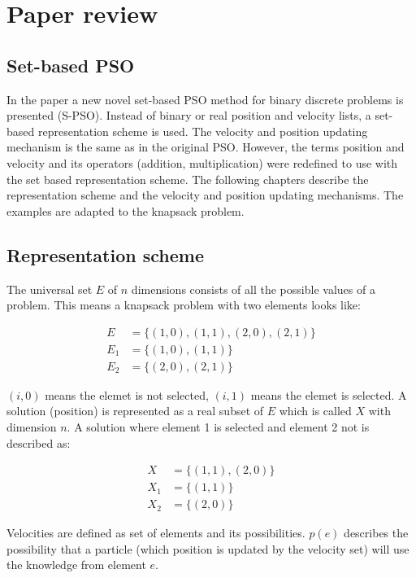 \documentclass{article}
\begin{document}
\section{Paper review}
\label{lbl-rev}
\subsection{Set-based PSO}
In the paper \cite{bib-sets} a new novel set-based PSO method for binary discrete problems is presented (S-PSO). Instead of binary or real position and velocity lists, a set-based representation scheme is used. The velocity and position updating mechanism is the same as in the original PSO. However, the terms position and velocity and its operators (addition, multiplication) were redefined to use with the set based representation scheme. The following chapters describe the representation scheme and the velocity and position updating mechanisms. The examples are adapted to the knapsack problem.

\subsection{Representation scheme}
The universal set $E$ of $n$ dimensions consists of all the possible values of a problem. This means a knapsack problem with two elements looks like:

\begin{equation}
\begin{aligned}
E &= \{(1,0),(1,1),(2,0),(2,1)\}\\
E_1 &= \{(1,0),(1,1)\}\\
E_2 &= \{(2,0),(2,1)\}
\end{aligned}
\end{equation}

$(i,0)$ means the elemet is not selected, $(i,1)$ means the elemet is selected. A solution (position) is represented as a real subset of $E$ which is called $X$ with dimension $n$. A solution where element 1 is selected and element 2 not is described as:

\begin{equation}
\begin{aligned}
X &= \{(1,1),(2,0)\}\\
X_1 &= \{(1,1)\}\\
X_2 &= \{(2,0)\}
\end{aligned}
\end{equation}

Velocities are defined as set of elements and its possibilities. $p(e)$ describes the possibility that a particle (which position is updated by the velocity set) will use the knowledge from element $e$.
\end{document}
